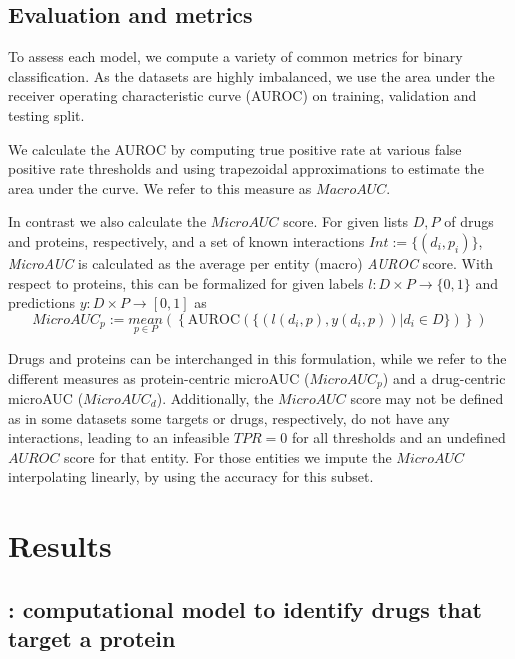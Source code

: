 \documentclass{bioinfo}
\begin{document}
\subsection{Evaluation and metrics}

To assess each model, we compute a variety of common metrics for
binary classification. As the datasets are highly imbalanced, we use
the area under the receiver operating characteristic curve
(AUROC) on training, validation and testing split. %

We calculate the AUROC by computing true positive rate at various
false positive rate thresholds and using trapezoidal approximations to
estimate the area under the curve. We refer to this measure as
$MacroAUC$.

In contrast we also calculate the $MicroAUC$ score. For given lists $D, P$ of drugs and proteins, respectively, and a set of known interactions $Int := \{(d_i, p_i) \}$, \textit{MicroAUC} is calculated as the average per entity (macro) \textit{AUROC} score. With respect to proteins, this can be formalized for given labels $l:D\times P \rightarrow \{0,1\}$ and predictions $y:D\times P \rightarrow [0,1]$  as 
\begin{equation*}
	MicroAUC_p := \underset{p\in P}{mean}\left(\left\{ \text{AUROC}(\{ (l(d_i, p), y(d_i,p))| d_i\in D\}) \right\}\right)
\end{equation*}

Drugs and proteins can be interchanged in this formulation, while we
refer to the different measures as protein-centric microAUC
($MicroAUC_p$) and a drug-centric microAUC
($MicroAUC_d$). Additionally, the $MicroAUC$ score may not be defined
as in some datasets some targets or drugs, respectively, do not have
any interactions, leading to an infeasible $TPR=0$ for all thresholds and an undefined
$AUROC$ score for that entity. For those entities we impute the $MicroAUC$ interpolating linearly, by using the accuracy for this subset.



\section{Results}

\subsection{\name: computational model to identify drugs that target a
  protein}
\end{document}
